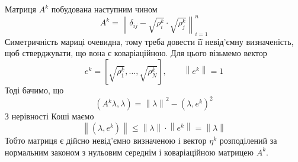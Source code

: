 Матриця $A^k$ побудована наступним чином
\begin{equation*}
  A^k
  = \left\| \delta_{ij} - \sqrt{\rho_i^k} \cdot \sqrt{\rho_j^k} \right\|_{i=1}^n
\end{equation*}
Симетричність мариці очевидна, тому треба довести її невід’ємну визначеність,
щоб стверджувати, що вона є коваріаційною.
Для цього візьмемо вектор
\begin{equation*}
  e^k = \left[ \sqrt{\rho_1^k}, \dots, \sqrt{\rho_N^k} \right],\qquad
  \left\| e^k \right\| = 1
\end{equation*}
Тоді бачимо, що
\begin{equation}\label{eq:chi2:quadraticForm}
  \left( A^k \lambda, \lambda \right)
  = \left\| \lambda \right\|^2
    - \left( \lambda, e^k \right)^2
\end{equation}
З нерівності Коші маємо
\begin{equation*}
  \left\| \left( \lambda, e^k \right) \right\|
  \le \left\| \lambda \right\| \cdot \left\| e^k \right\|
  = \left\| \lambda \right\|
\end{equation*}
Тобто матриця є дійсно невід’ємно визначеною і вектор $\eta^k$ розподілений
за нормальним законом з нульовим середнім і коваріаційною матрицею $A^k$.

